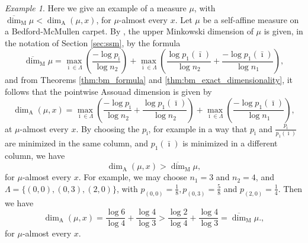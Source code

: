 \documentclass{PRM}
\newcommand{\updim}{\overline{\dim}}
\newcommand{\adim}{\dim_{\mathrm{A}}}
\theoremstyle{plain}
\theoremstyle{definition}
\theoremstyle{remark}
\newtheorem{example}[thm]{Example}
\begin{document}
\begin{example}\label{ex:bm_example}
    Here we give an example of a measure $\mu$, with $\updim_{\mathrm{M}}\mu<\adim(\mu,x)$, for $\mu$-almost every $x$. Let $\mu$ be a self-affine measure on a Bedford-McMullen carpet. By \cite[Theorem 8.6.2]{F}, the upper Minkowski dimension of $\mu$ is given, in the notation of Section \ref{sec:ssm}, by the formula
    \begin{equation*}
        \updim_{\mathrm{M}}\mu=\max_{\bar{\imath}\in\Lambda}\left(\frac{-\log p_{\bar{\imath}}}{\log n_2}\right)+\max_{\bar{\imath}\in\Lambda}\left(\frac{\log p_1(\bar{\imath})}{\log n_2}+\frac{-\log p_1(\bar{\imath})}{\log n_1}\right),
    \end{equation*}
    and from Theorems \ref{thm:bm_formula} and \ref{thm:bm_exact_dimensionality}, it follows that the pointwise Assouad dimension is given by
    \begin{equation*}
        \adim(\mu,x)=\max_{\bar{\imath}\in\Lambda}\left(\frac{-\log p_{\bar{\imath}}}{\log n_2}+\frac{\log p_1(\bar{\imath})}{\log n_2}\right)+\max_{\bar{\imath}\in\Lambda}\left(\frac{-\log p_1(\bar{\imath})}{\log n_1}\right),
    \end{equation*}
    at $\mu$-almost every $x$. By choosing the $p_{\bar{\imath}}$, for example in a way that $p_{\bar{\imath}}$ and $\frac{p_{\bar{\imath}}}{p_1(\bar{\imath})}$ are minimized in the same column, and $p_1(\bar{\imath})$ is minimized in a different column, we have
    \begin{equation*}
        \adim(\mu,x)>\updim_{\mathrm{M}}\mu,
    \end{equation*}
    for $\mu$-almost every $x$. For example, we may choose $n_1=3$ and $n_2=4$, and $\Lambda=\{(0,0),(0,3),(2,0)\}$, with $p_{(0,0)}=\frac{1}{8},p_{(0,3)}=\frac{5}{8}$ and $p_{(2,0)}=\frac{1}{4}$. Then we have
    \begin{equation*}
        \adim(\mu,x)=\frac{\log 6}{\log 4}+\frac{\log 4}{\log 3}> \frac{\log2}{\log 4}+\frac{\log 4}{\log 3}=\updim_{\mathrm{M}}\mu.,
    \end{equation*}
    for $\mu$-almost every $x$.
    \end{example}
\end{document}
